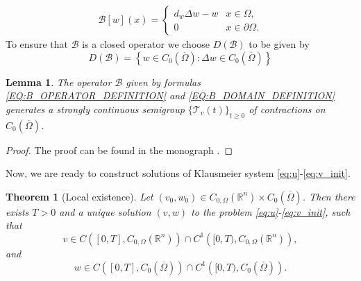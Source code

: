 \documentclass[11pt, a4paper]{article}
\theoremstyle{break}
\newtheorem{thm}{Theorem}[section]
\theoremstyle{break}
\theoremstyle{break}
\theoremstyle{break}
\theoremstyle{break}
\newtheorem{lem}{Lemma}[section]
\theoremstyle{break}
\theoremstyle{break}
\begin{document}
\begin{align}
    \label{EQ:B_OPERATOR_DEFINITION}
    \mathcal{B}[w](x) = 
    \begin{cases}
        d_w \Delta w - w &x \in \Omega, \\
        0 &x \in \partial \Omega.
    \end{cases}
\end{align}
To ensure that $\mathcal{B}$ is a closed operator we choose $D(\mathcal{B})$ to be given by
\begin{equation}
    \label{EQ:B_DOMAIN_DEFINITION}
    D(\mathcal{B}) = \left\{ w \in C_0(\overline{\Omega}): \Delta w \in C_0(\overline{\Omega}) \right\}
\end{equation}
\begin{lem}
    \label{lem:B_SEMIGROUP_GENERATOR}
    The operator $\mathcal{B}$ given by formulas \eqref{EQ:B_OPERATOR_DEFINITION} and \eqref{EQ:B_DOMAIN_DEFINITION} generates a strongly continuous semigroup $\{\mathcal{T}_v(t)\}_{t \geq 0}$ of contractions on $C_0(\overline{\Omega})$.
\end{lem}
\begin{proof}
    The proof can be found in the monograph \cite[Theorem 6.1.8]{Arendt2001}.
\end{proof}
Now, we are ready to construct solutions of Klausmeier system \eqref{eq:u}-\eqref{eq:v_init}.
\begin{thm}[Local existence]
    \label{thm:Well-Posedness}
    Let $(v_0, w_0) \in C_{0, \Omega}(\mathbb{R}^n) \times C_0(\overline{\Omega})$. Then there exists $T > 0$ and a unique solution $(v, w)$ to the problem \eqref{eq:u}-\eqref{eq:v_init}, such that
    \begin{equation}
        v \in C\left([0, T], C_{0, \Omega}(\mathbb{R}^n)\right) \cap C^1\left([0, T), C_{0, \Omega}(\mathbb{R}^n)\right),
    \end{equation}
    and
    \begin{equation}
        w \in C\left([0, T], C_0(\overline{\Omega})\right) \cap C^1\left([0, T), C_0(\overline{\Omega})\right).
    \end{equation}
\end{thm}
\end{document}
